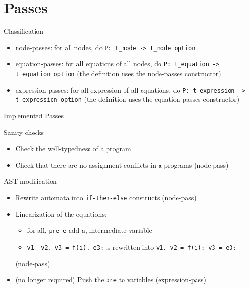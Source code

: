 \documentclass{beamer}
\begin{document}
\section{Passes}
\begin{frame}{}
    \begin{block}{Classification}
        \begin{itemize}
            \item node-passes: for all nodes, do \texttt{P: t\_node -> t\_node
            option}
            \pause
            \item equation-passes: for all equations of all nodes, do
            \texttt{P: t\_equation -> t\_equation option}
            (the definition uses the node-passes constructor)
            \pause
            \item expression-passes: for all expression of all equations, do
            \texttt{P: t\_expression -> t\_expression option}
            (the definition uses the equation-passes constructor)
        \end{itemize}
    \end{block}
\end{frame}
\begin{frame}{Implemented Passes}
	\begin{block}{Sanity checks}
		\begin{itemize}
			\item Check the well-typedness of a program
            \pause
			\item Check that there are no assignment conflicts in a programs
            (node-pass)
            \pause
		\end{itemize}
	\end{block}
	\begin{block}{AST modification}
		\begin{itemize}
			\item Rewrite automata into \texttt{if-then-else} constructs
            (node-pass)
            \pause
			\item Linearization of the equations:
            \begin{itemize}
                \item for all, \texttt{pre e} add a, intermediate variable
                \item \texttt{v1, v2, v3 = f(i), e3;} is rewritten into
                \texttt{v1, v2 = f(i); v3 = e3;}
            \end{itemize}
            (node-pass)
            \pause
			\item (no longer required) Push the \texttt{pre} to variables
            (expression-pass)
		\end{itemize}
	\end{block}
\end{frame}
\end{document}
